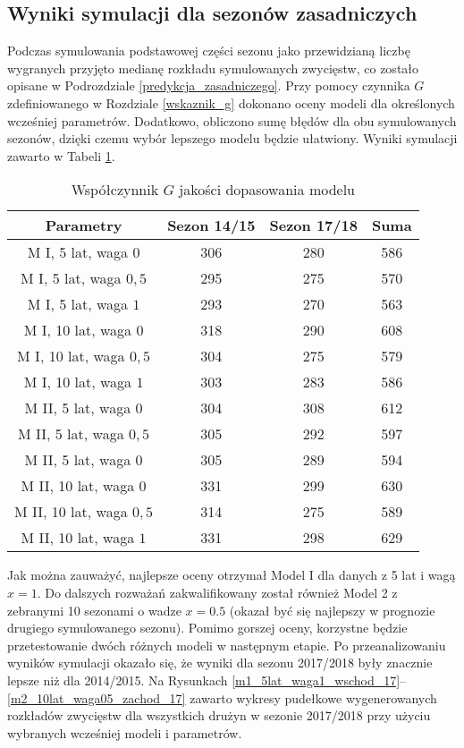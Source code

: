 \documentclass[inzynierska]{pwr_wmat_praca_dyplomowa}
\theoremstyle{plain}
\numberwithin{theorem}{chapter}
\theoremstyle{definition}
\numberwithin{theorem}{chapter}
\begin{document}
\subsection{Wyniki symulacji dla sezonów zasadniczych}
Podczas symulowania podstawowej części sezonu jako przewidzianą liczbę wygranych przyjęto medianę rozkładu symulowanych zwycięstw, co zostało opisane w Podrozdziale \ref{predykcja_zasadniczego}. Przy pomocy czynnika $G$ zdefiniowanego w Rozdziale \ref{wskaznik_g} dokonano oceny modeli dla określonych wcześniej parametrów. Dodatkowo, obliczono sumę błędów dla obu symulowanych sezonów, dzięki czemu wybór lepszego modelu będzie ułatwiony. Wyniki symulacji zawarto w Tabeli \ref{tabela_porownianie_modeli}.
\begin{table}[]
	\centering
	\begin{tabular}{|c|c|c|c|}
		\hline
		\textbf{Parametry} & \textbf{Sezon 14/15} & \textbf{Sezon 17/18} & \textbf{Suma} \\ \hline
		M I, 5 lat, waga $0$ & 306  & 280 & 586\\ \hline
		M I, 5 lat, waga $0,5$ & 295 & 275 & 570 \\ \hline
		M I, 5 lat, waga $1$ & 293 & 270 & 563\\ \hline
		M I, 10 lat, waga $0$ & 318 & 290 & 608\\ \hline
		M I, 10 lat, waga $0,5$ & 304 & 275 & 579\\ \hline
		M I, 10 lat, waga $1$ & 303 & 283 & 586\\ \hline
		M II, 5 lat, waga $0$ &  304 & 308 & 612\\ \hline
		M II, 5 lat, waga $0,5$ & 305 & 292 & 597\\ \hline
		M II, 5 lat, waga $0$ & 305 & 289 & 594\\ \hline
		M II, 10 lat, waga $0$ & 331 & 299 & 630\\ \hline
		M II, 10 lat, waga $0,5$& 314 & 275 & 589 \\ \hline
		M II, 10 lat, waga $1$ & 331 & 298 & 629 \\ \hline
	\end{tabular}
	\caption{Współczynnik $G$ jakości dopasowania modelu}\label{tabela_porownianie_modeli}	
\end{table}
Jak można zauważyć, najlepsze oceny otrzymał Model I dla danych z 5 lat i wagą $x=1$. Do dalszych rozważań zakwalifikowany został również Model 2 z zebranymi 10 sezonami o wadze $x=0.5$ (okazał być się najlepszy w prognozie drugiego symulowanego sezonu). Pomimo gorszej oceny, korzystne będzie przetestowanie dwóch różnych modeli w następnym etapie.  Po przeanalizowaniu wyników symulacji okazało się, że wyniki dla sezonu 2017/2018 były znacznie lepsze niż dla 2014/2015. Na Rysunkach \ref{m1_5lat_waga1_wschod_17}--\ref{m2_10lat_waga05_zachod_17} zawarto wykresy pudełkowe wygenerowanych rozkładów zwycięstw dla wszystkich drużyn w sezonie 2017/2018 przy użyciu wybranych wcześniej modeli i parametrów. 
\end{document}
